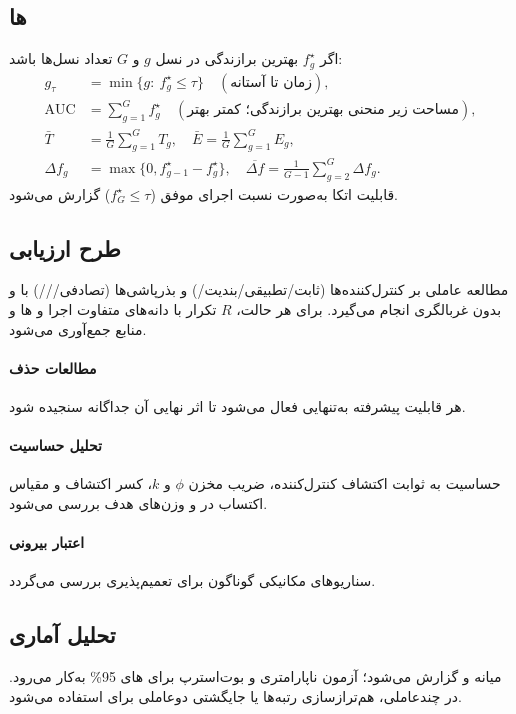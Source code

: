 \subsection{‌ها}
اگر $f^{\star}_g$ بهترین برازندگی در نسل $g$ و $G$ تعداد نسل‌ها باشد:
\begin{align}
 g_{\tau} &= \min\{g:\ f^{\star}_g\le\tau\}\quad(\text{زمان تا آستانه}),\\
 \mathrm{AUC} &= \sum_{g=1}^{G} f^{\star}_g\quad(\text{مساحت زیر منحنی بهترین برازندگی؛ کمتر بهتر}),\\
 \bar T &= \frac{1}{G}\sum_{g=1}^{G} T_g,\quad \bar E = \frac{1}{G}\sum_{g=1}^{G} E_g,\\
 \Delta f_g &= \max\{0, f^{\star}_{g-1}-f^{\star}_g\},\quad \overline{\Delta f}=\frac{1}{G-1}\sum_{g=2}^{G}\Delta f_g.
\end{align}
قابلیت اتکا به‌صورت نسبت اجرای موفق ($f^{\star}_G\le\tau$) گزارش می‌شود.

\subsection{طرح ارزیابی}
مطالعه عاملی بر کنترل‌کننده‌ها (ثابت/تطبیقی/بندیت/) و بذرپاشی‌ها (تصادفی///) با و بدون غربالگری انجام می‌گیرد. برای هر حالت، $R$ تکرار با دانه‌های متفاوت اجرا و ‌ها و منابع جمع‌آوری می‌شود.
\paragraph{مطالعات حذف}
هر قابلیت پیشرفته به‌تنهایی فعال می‌شود تا اثر نهایی آن جداگانه سنجیده شود.
\paragraph{تحلیل حساسیت}
حساسیت به ثوابت اکتشاف کنترل‌کننده، ضریب مخزن $\phi$ و $k$، کسر اکتشاف و مقیاس اکتساب در  و وزن‌های هدف بررسی می‌شود.
\paragraph{اعتبار بیرونی}
سناریوهای مکانیکی گوناگون برای تعمیم‌پذیری بررسی می‌گردد.

\subsection{تحلیل آماری}
میانه و  گزارش می‌شود؛ آزمون ناپارامتری  و بوت‌استرپ برای ‌های 95\% به‌کار می‌رود. در چندعاملی، هم‌ترازسازی رتبه‌ها یا  جایگشتی دوعاملی برای  استفاده می‌شود.

